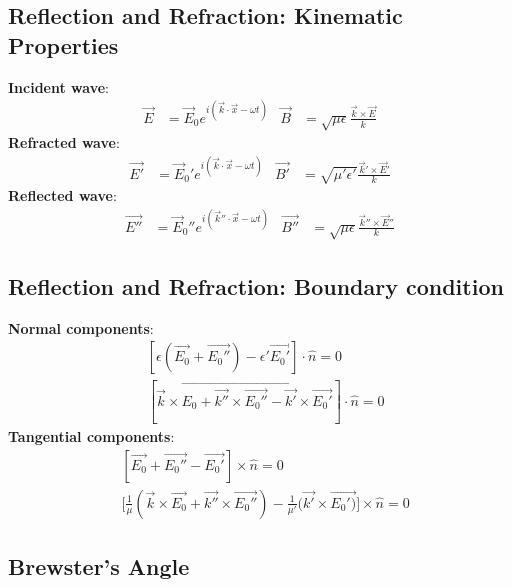 \documentclass[a4paper, 11pt, landscape]{article}
\begin{document}
\begin{multicols*}{3}
\subsection{Reflection and Refraction: Kinematic Properties}
\begin{compactenum}
	\textbf{Incident wave}:
		\begin{align*}
	        \vec{E} &= \vec{E}_{0}e^{i(\vec{k}\cdot\vec{x} - \omega t)} &
	        \vec{B} &= \sqrt{\mu \epsilon}\frac{\vec{k}\times\vec{E}}{k}
	    \end{align*}
	\textbf{Refracted wave}:
		\begin{align*}
	        \vec{E'} &= \vec{E}_{0}'e^{i(\vec{k}\cdot\vec{x} - \omega t)} &
	        \vec{B'} &= \sqrt{\mu' \epsilon'}\frac{\vec{k}'\times\vec{E}'}{k}
	    \end{align*}
	\textbf{Reflected wave}:
		\begin{align*}
	        \vec{E''} &= \vec{E}_{0}''e^{i(\vec{k}''\cdot\vec{x} - \omega t)} &
	        \vec{B''} &= \sqrt{\mu \epsilon}\frac{\vec{k}''\times\vec{E}''}{k}
	    \end{align*}
\end{compactenum}

\subsection{Reflection and Refraction: Boundary condition}
\begin{compactenum}
\textbf{Normal components}:
	\begin{align*}
        &[\epsilon(\vec{E_{0}} + \vec{E_{0}''}) - \epsilon'\vec{E_{0}'}] \cdot \hat{n} = 0 \\
	&[\vec{k} \times \vec{E_{0} + \vec{k''} \times \vec{E_{0}''} - \vec{k'} \times \vec{E_{0}'}}] \cdot \hat{n} = 0
	\end{align*}
\textbf{Tangential components}:
    \begin{align*}
        &[\vec{E_{0}} + \vec{E_{0}''} - \vec{E_{0}'}] \times \hat{n} = 0 \\
        &\Big[\frac{1}{\mu}(\vec{k} \times \vec{E_{0}} + \vec{k''} \times \vec{E_{0}''}) - \frac{1}{\mu'}(\vec{k'} \times \vec{E_{0}')}\Big] \times \hat{n} = 0
	\end{align*}
\end{compactenum}

\subsection{Brewster’s Angle}
\begin{compactenum}


\end{compactenum}
\end{multicols*}
\end{document}
